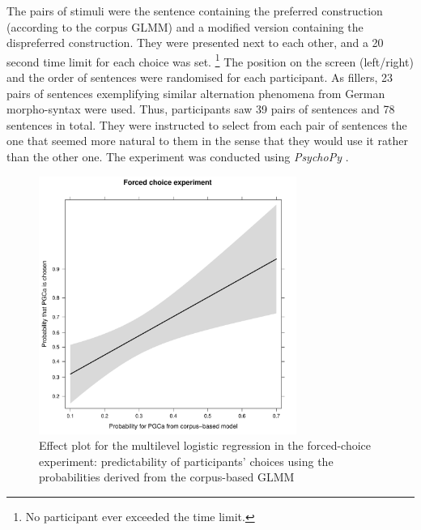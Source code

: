 \documentclass[USenglish]{article}
\begin{document}
The pairs of stimuli were the sentence containing the preferred construction (according to the corpus GLMM) and a modified version containing the dispreferred construction.
They were presented next to each other, and a 20 second time limit for each choice was set.%
\footnote{No participant ever exceeded the time limit.}
The position on the screen (left\slash right) and the order of sentences were randomised for each participant.
As fillers, 23 pairs of sentences exemplifying similar alternation phenomena from German morpho-syntax were used.
Thus, participants saw 39 pairs of sentences and 78 sentences in total.
They were instructed to select from each pair of sentences the one that seemed more natural to them in the sense that they would use it rather than the other one.
The experiment was conducted using \textit{PsychoPy} \citep{Peirce2007}.

\begin{figure}[hb!]
\centering
\includegraphics[width=0.75\textwidth]{../R/output/fc_effects}
\caption{Effect plot for the multilevel logistic regression in the forced-choice experiment: predictability of participants' choices using the probabilities derived from the corpus-based GLMM}
\label{fig:afc:effects}
\end{figure}
\end{document}
